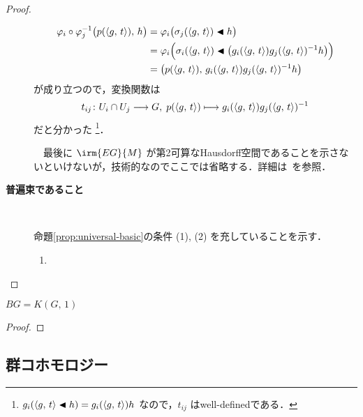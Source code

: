 \documentclass[TQFT_main]{subfiles}
\begin{document}
\begin{proof}
\begin{description}
\begin{align}
            \varphi_i \circ \varphi_j^{-1}\bigl(p(\expval{g,\, t}),\, h\bigr) 
            &= \varphi_i \bigl( \sigma_j(\expval{g,\, t}) \blacktriangleleft h \bigr) \\
            &= \varphi_i \Bigl( \sigma_i(\expval{g,\, t}) \blacktriangleleft \bigl(g_i(\expval{g,\, t}) g_j(\expval{g,\, t})^{-1} h\bigr)  \Bigr) \\
            &= \bigl( p(\expval{g,\, t}),\, g_i(\expval{g,\, t}) g_j(\expval{g,\, t})^{-1} h \bigr) 
        \end{align}
        が成り立つので，変換関数は
        \begin{align}
            t_{ij} \colon U_i \cap U_j \longrightarrow G,\; p(\expval{g,\, t}) \longmapsto  g_i(\expval{g,\, t}) g_j(\expval{g,\, t})^{-1}
        \end{align}
        だと分かった
        \footnote{
            $g_i(\expval{g,\, t} \blacktriangleleft h) = g_i(\expval{g,\, t})h$ なので，$t_{ij}$ はwell-definedである．
        }．
        
        　最後に $\irm{EG}{M}$ が第2可算なHausdorff空間であることを示さないといけないが，技術的なのでここでは省略する．詳細は~\cite[p.55, 11.2 Theorem]{Husemoller1994}を参照．

        \item[\textbf{普遍束であること}]　
        
        命題\ref{prop:universal-basic}の条件 (1), (2) を充していることを示す．
        \begin{enumerate}
            \item 
        \end{enumerate}
        
    \end{description}
    
\end{proof}

\begin{myprop}[label=prop:classifying-space-Kpi1]{}
    $BG = K(G,\, 1)$
\end{myprop}

\begin{proof}
    
\end{proof}


\subsection{群コホモロジー}
\end{document}
